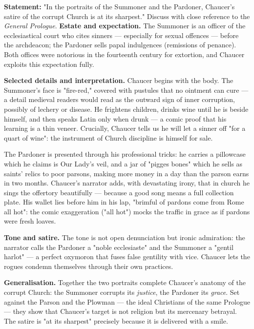 \documentclass[11pt]{article}
\newcommand{\cle}[1]{{\popxbold\color{popdark}#1}}
\begin{document}
\begin{exoresolu}
\textbf{Statement:} "In the portraits of the Summoner and the Pardoner, Chaucer's satire of the corrupt Church is at its sharpest." Discuss with close reference to the \emph{General Prologue}.
\tcblower
\textbf{Estate and expectation.} The Summoner is an officer of the ecclesiastical court who cites sinners — especially for sexual offences — before the archdeacon; the Pardoner sells papal indulgences (remissions of penance). Both offices were notorious in the fourteenth century for extortion, and Chaucer exploits this expectation fully.

\textbf{Selected details and interpretation.} Chaucer begins with the body. The Summoner's face is "fire-red," covered with pustules that no ointment can cure — a detail medieval readers would read as the outward sign of inner corruption, possibly of lechery or disease. He frightens children, drinks wine until he is beside himself, and then speaks Latin only when drunk — a comic proof that his learning is a thin veneer. Crucially, Chaucer tells us he will let a sinner off "for a quart of wine": the instrument of Church discipline is himself for sale.

The Pardoner is presented through his \cle{professional tricks}: he carries a pillowcase which he claims is Our Lady's veil, and a jar of "pigges bones" which he sells as saints' relics to poor parsons, making more money in a day than the parson earns in two months. Chaucer's narrator adds, with devastating irony, that in church he sings the offertory beautifully — because a good song means a full collection plate. His wallet lies before him in his lap, "brimful of pardons come from Rome all hot": the comic exaggeration ("all hot") mocks the traffic in grace as if pardons were fresh loaves.

\textbf{Tone and satire.} The tone is not open denunciation but \cle{ironic admiration}: the narrator calls the Pardoner a "noble ecclesiaste" and the Summoner a "gentil harlot" — a perfect oxymoron that fuses false gentility with vice. Chaucer lets the rogues condemn themselves through their own practices.

\textbf{Generalisation.} Together the two portraits complete Chaucer's anatomy of the corrupt Church: the Summoner corrupts its \emph{justice}, the Pardoner its \emph{grace}. Set against the Parson and the Plowman — the ideal Christians of the same Prologue — they show that Chaucer's target is not religion but its mercenary betrayal. The satire is "at its sharpest" precisely because it is delivered with a smile.
\end{exoresolu}
\end{document}
